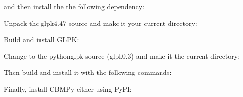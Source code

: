\documentclass[letterpaper,10pt,english]{sphinxmanual}
\begin{document}
\sphinxAtStartPar
and then install the the following dependency:

\begin{sphinxVerbatim}[commandchars=\\\{\}]
   
\end{sphinxVerbatim}

\sphinxAtStartPar
Unpack the glpk\sphinxhyphen{}4.47 source and make it your current directory:

\begin{sphinxVerbatim}[commandchars=\\\{\}]
    
\end{sphinxVerbatim}

\sphinxAtStartPar
Build and install GLPK:

\begin{sphinxVerbatim}[commandchars=\\\{\}]
 
 
  
 
\end{sphinxVerbatim}

\sphinxAtStartPar
Change to the python\sphinxhyphen{}glpk source (glpk\sphinxhyphen{}0.3) and make it the current directory:

\begin{sphinxVerbatim}[commandchars=\\\{\}]
    
\end{sphinxVerbatim}

\sphinxAtStartPar
Then build and install it with the following commands:

\begin{sphinxVerbatim}[commandchars=\\\{\}]
  
\end{sphinxVerbatim}

\sphinxAtStartPar
Finally, install CBMPy either using PyPI:

\begin{sphinxVerbatim}[commandchars=\\\{\}]
  
 
\end{sphinxVerbatim}
\end{document}
